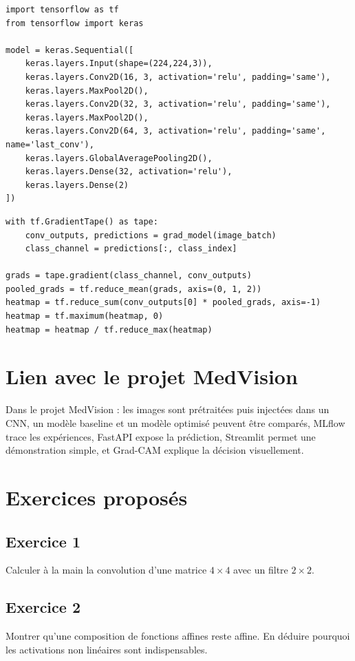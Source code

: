 \documentclass[11pt,a4paper]{article}
\begin{document}
\begin{lstlisting}
import tensorflow as tf
from tensorflow import keras

model = keras.Sequential([
    keras.layers.Input(shape=(224,224,3)),
    keras.layers.Conv2D(16, 3, activation='relu', padding='same'),
    keras.layers.MaxPool2D(),
    keras.layers.Conv2D(32, 3, activation='relu', padding='same'),
    keras.layers.MaxPool2D(),
    keras.layers.Conv2D(64, 3, activation='relu', padding='same', name='last_conv'),
    keras.layers.GlobalAveragePooling2D(),
    keras.layers.Dense(32, activation='relu'),
    keras.layers.Dense(2)
])
\end{lstlisting}

\begin{lstlisting}
with tf.GradientTape() as tape:
    conv_outputs, predictions = grad_model(image_batch)
    class_channel = predictions[:, class_index]

grads = tape.gradient(class_channel, conv_outputs)
pooled_grads = tf.reduce_mean(grads, axis=(0, 1, 2))
heatmap = tf.reduce_sum(conv_outputs[0] * pooled_grads, axis=-1)
heatmap = tf.maximum(heatmap, 0)
heatmap = heatmap / tf.reduce_max(heatmap)
\end{lstlisting}

\section{Lien avec le projet MedVision}

Dans le projet MedVision : les images sont prétraitées puis injectées dans un CNN, un modèle baseline et un modèle optimisé peuvent être comparés, MLflow trace les expériences, FastAPI expose la prédiction, Streamlit permet une démonstration simple, et Grad-CAM explique la décision visuellement.

\section{Exercices proposés}

\subsection*{Exercice 1}
Calculer à la main la convolution d'une matrice $4\times4$ avec un filtre $2\times2$.

\subsection*{Exercice 2}
Montrer qu'une composition de fonctions affines reste affine. En déduire pourquoi les activations non linéaires sont indispensables.
\end{document}

